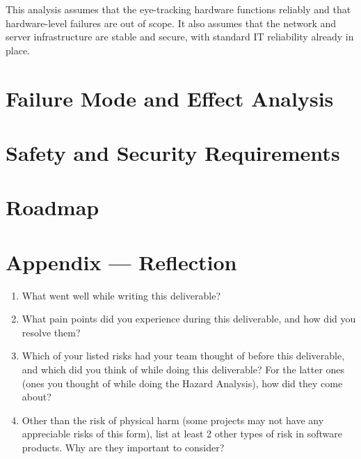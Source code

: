 \documentclass{article}
\begin{document}
This analysis assumes that the eye-tracking hardware functions reliably and that hardware-level failures are out of scope. It also assumes that the network and server infrastructure are stable and secure, with standard IT reliability already in place.

\section{Failure Mode and Effect Analysis}


\section{Safety and Security Requirements}


\section{Roadmap}


\newpage{}

\section*{Appendix --- Reflection}




\begin{enumerate}
    \item What went well while writing this deliverable? 
    \item What pain points did you experience during this deliverable, and how
    did you resolve them?
    \item Which of your listed risks had your team thought of before this
    deliverable, and which did you think of while doing this deliverable? For
    the latter ones (ones you thought of while doing the Hazard Analysis), how
    did they come about?
    \item Other than the risk of physical harm (some projects may not have any
    appreciable risks of this form), list at least 2 other types of risk in
    software products. Why are they important to consider?
\end{enumerate}
\end{document}
